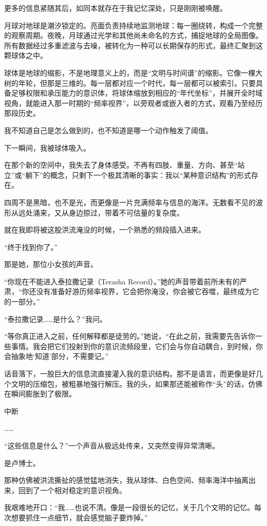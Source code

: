 更多的信息紧随其后，如同本就存在于我记忆深处，只是刚刚被唤醒。

月球对地球是潮汐锁定的。亮面负责持续地监测地球：每一圈绕转，构成一个完整的观察周期。夜晚，月球通过光学和其他尚未命名的方式，捕捉地球的全局图像。所有数据经过多重滤波与去噪，被转化为一种可以长期保存的形式，最终汇聚到这颗球体之中。

球体是地球的缩影，不是地理意义上的，而是“文明与时间谱”的缩影。它像一棵大树的年轮，但那是三维的。每一层都对应一个时代，每一层都可以被索引。只要具备足够权限和承压能力的意识体，将球体缩放到相应的“年代坐标”，并展开全时域视角，就能进入那一时期的“频率视界”，以旁观者或嵌入者的方式，观看乃至经历那段历史。

我不知道自己是怎么做到的，也不知道是哪一个动作触发了阈值。

下一瞬间，我被球体吸入。

在那个新的空间中，我失去了身体感受。不再有四肢、重量、方向、甚至“站立”或“躺下”的概念，只剩下一个极其清晰的事实：我以“某种意识结构”的形式存在。

四周不是黑暗，也不是光，而更像是一片充满频率与信息的海洋。无数看不见的波形从远处涌来，又从身边掠过，带着不可估量的复杂度。

就在我即将被这股洪流淹没的时候，一个熟悉的频段插入进来。

“终于找到你了。”

那是她，那位小女孩的声音。

“你现在不能进入泰拉撒记录（Terasha Record）。”她的声音带着前所未有的严肃，“你还没有准备好游历频率视界，它会把你淹没，你会被它吞噬，最终成为它的一部分。”

“泰拉撒记录……是什么？”我问。

“等你真正进入之前，任何解释都是徒劳的。”她说，“在此之前，我需要先告诉你一些事情。我会把它们投射到你的意识流频段里，它们会与你自动耦合，到时候，你会抽象地‘知道’部分，不需要记。”

话音落下，一股巨大的信息流直接灌入我的意识结构。那不是语言，而更像是好几个文明的压缩包，被粗暴地强行解压。我的头，如果那还能被称作“头”的话，仿佛在瞬间膨胀到了极限。

中断

……

“这些信息是什么？”一个声音从极远处传来，又突然变得异常清晰。

是卢博士。

那种仿佛被洪流撕扯的感觉猛地消失，我从球体、白色空间、频率海洋中抽离出来，回到了一个相对稳定的意识视角。

我艰难地开口：“我……也说不清。像是一段很长的记忆，关于几个文明的记忆。每次想要抓住一点细节，就会感觉脑子要炸掉。”


